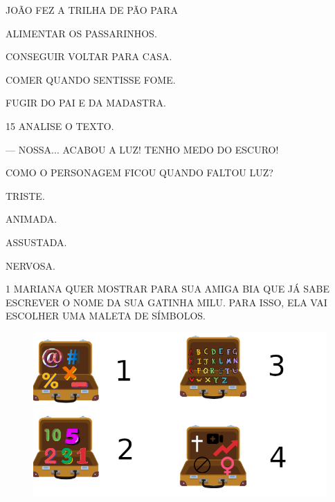JOÃO FEZ A TRILHA DE PÃO PARA

\begin{escolha}[itemsep=-5pt]
\item ALIMENTAR OS PASSARINHOS.

\item CONSEGUIR VOLTAR PARA CASA.

\item COMER QUANDO SENTISSE FOME.

\item FUGIR DO PAI E DA MADASTRA.
\end{escolha}

\num{15} ANALISE O TEXTO.

\begin{myquote}
--- NOSSA... ACABOU A LUZ! TENHO MEDO DO ESCURO!
\end{myquote}

COMO O PERSONAGEM FICOU QUANDO FALTOU LUZ?

\begin{multicols}{2}
\begin{escolha}
\item TRISTE.

\item ANIMADA.

\item ASSUSTADA.

\item NERVOSA.
\end{escolha}
\end{multicols}

\pagebreak



\pagebreak

\num{1} MARIANA QUER MOSTRAR PARA SUA AMIGA BIA QUE JÁ SABE ESCREVER O NOME DA SUA GATINHA MILU. PARA ISSO, ELA VAI ESCOLHER UMA MALETA DE SÍMBOLOS. 

\begin{figure}[htpb!]
\includegraphics[width=\textwidth]{media/image209.png}
\end{figure}


